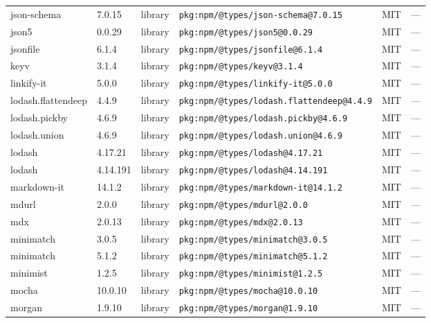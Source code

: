 \documentclass[11pt,a4paper]{article}
\begin{document}
\begin{longtable}{|p{4cm}|p{2cm}|p{1.6cm}|p{5cm}|p{1.5cm}|p{3.5cm}|}
\raggedright json-schema & 7.0.15 & library & \small\texttt{pkg:npm/@types/json-schema@7.0.15} & MIT & \small — \\
\raggedright json5 & 0.0.29 & library & \small\texttt{pkg:npm/@types/json5@0.0.29} & MIT & \small — \\
\raggedright jsonfile & 6.1.4 & library & \small\texttt{pkg:npm/@types/jsonfile@6.1.4} & MIT & \small — \\
\raggedright keyv & 3.1.4 & library & \small\texttt{pkg:npm/@types/keyv@3.1.4} & MIT & \small — \\
\raggedright linkify-it & 5.0.0 & library & \small\texttt{pkg:npm/@types/linkify-it@5.0.0} & MIT & \small — \\
\raggedright lodash.flattendeep & 4.4.9 & library & \small\texttt{pkg:npm/@types/lodash.flattendeep@4.4.9} & MIT & \small — \\
\raggedright lodash.pickby & 4.6.9 & library & \small\texttt{pkg:npm/@types/lodash.pickby@4.6.9} & MIT & \small — \\
\raggedright lodash.union & 4.6.9 & library & \small\texttt{pkg:npm/@types/lodash.union@4.6.9} & MIT & \small — \\
\raggedright lodash & 4.17.21 & library & \small\texttt{pkg:npm/@types/lodash@4.17.21} & MIT & \small — \\
\raggedright lodash & 4.14.191 & library & \small\texttt{pkg:npm/@types/lodash@4.14.191} & MIT & \small — \\
\raggedright markdown-it & 14.1.2 & library & \small\texttt{pkg:npm/@types/markdown-it@14.1.2} & MIT & \small — \\
\raggedright mdurl & 2.0.0 & library & \small\texttt{pkg:npm/@types/mdurl@2.0.0} & MIT & \small — \\
\raggedright mdx & 2.0.13 & library & \small\texttt{pkg:npm/@types/mdx@2.0.13} & MIT & \small — \\
\raggedright minimatch & 3.0.5 & library & \small\texttt{pkg:npm/@types/minimatch@3.0.5} & MIT & \small — \\
\raggedright minimatch & 5.1.2 & library & \small\texttt{pkg:npm/@types/minimatch@5.1.2} & MIT & \small — \\
\raggedright minimist & 1.2.5 & library & \small\texttt{pkg:npm/@types/minimist@1.2.5} & MIT & \small — \\
\raggedright mocha & 10.0.10 & library & \small\texttt{pkg:npm/@types/mocha@10.0.10} & MIT & \small — \\
\raggedright morgan & 1.9.10 & library & \small\texttt{pkg:npm/@types/morgan@1.9.10} & MIT & \small — \\

\end{longtable}
\end{document}
